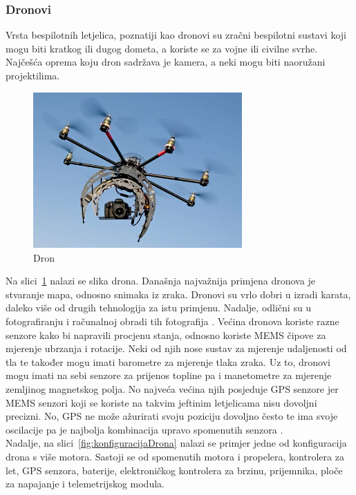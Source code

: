 \documentclass[times, utf8, diplomski]{fer}
\begin{document}
\subsubsection{Dronovi}
Vrsta bespilotnih letjelica, poznatiji kao dronovi su zračni bespilotni sustavi koji mogu biti kratkog ili dugog dometa, a koriste se za vojne ili civilne svrhe. Najčešća oprema koju dron sadržava je kamera, a neki mogu biti naoružani projektilima. 
\begin{figure}[htb]
\centering
\includegraphics[width=8cm]{img/drone.png}
\caption{Dron\protect\footnotemark}
\label{fig:dron}
\end{figure}
Na  slici~\ref{fig:dron}  nalazi  se  slika 
drona. Današnja najvažnija primjena dronova je stvaranje mapa, odnosno snimaka iz zraka. Dronovi su  vrlo dobri u izradi karata, daleko više od drugih tehnologija za istu primjenu. Nadalje, odlični su u fotografiranju i računalnoj  obradi  tih  fotografija \citep[str.~10]{Drones}. Većina dronova koriste razne senzore kako  bi  napravili  procjenu  stanja,  odnosno  koriste  MEMS  čipove  za  mjerenje  ubrzanja  i rotacije. Neki od njih nose sustav za mjerenje udaljenosti od tla te također mogu imati barometre za  mjerenje  tlaka  zraka.  Uz  to,  dronovi  mogu  imati  na  sebi senzore  za  prijenos  topline  pa  i manetometre za mjerenje zemljinog magnetskog polja. No najveća većina njih posjeduje GPS senzore jer MEMS senzori koji se koriste na takvim jeftinim letjelicama nisu dovoljni precizni. No, GPS ne može ažurirati svoju poziciju dovoljno često te ima svoje oscilacije pa je najbolja kombinacija  upravo  spomenutih  senzora \citep[str.~13]{Drones}.\\
Nadalje, na slici~\ref{fig:konfiguracijaDrona} nalazi se primjer jedne od konfiguracija drona s više motora. Sastoji  se  od  spomenutih  motora  i  propelera,  kontrolera  za  let,  GPS  senzora,  baterije, elektroničkog kontrolera za brzinu, prijemnika, ploče za napajanje i telemetrijskog modula. 
\end{document}

